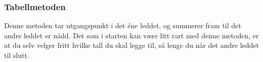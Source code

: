 \subsubsection{Tabellmetoden}
Denne metoden tar utgangspunkt i det éne leddet, og summerer fram til det andre leddet er nådd. Det som i starten kan være litt rart med denne metoden, er at du selv velger fritt hvilke tall du skal legge til, så lenge du når det andre leddet til slutt.
\begin{center}
	\parbox{0.3\linewidth}{
	} \qquad
	\parbox{0.3\linewidth}{
	}
\end{center}
\newpage
